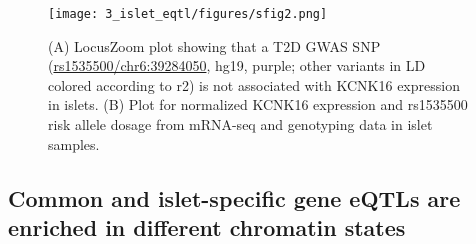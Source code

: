 \begin{figure}
    \centering
    \texttt{[image: 3\_islet\_eqtl/figures/sfig2.png]}
    \caption[The \textit{KCNK16} genomic locus]{(A) LocusZoom plot showing that a T2D GWAS SNP (\url{rs1535500/chr6:39284050}, hg19, purple; other variants in LD colored according to r2) is not associated with KCNK16 expression in islets. (B) Plot for normalized KCNK16 expression and rs1535500 risk allele dosage from mRNA-seq and genotyping data in islet samples.}
    \label{fig:c2_sf2}
\end{figure}

\subsection{Common and islet-specific gene eQTLs are enriched in different chromatin states} 
